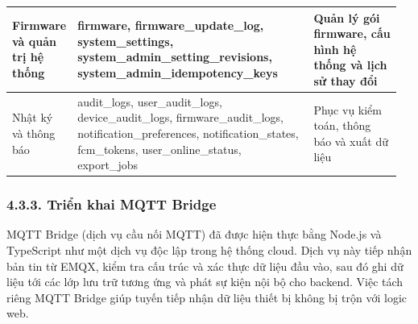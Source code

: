 \documentclass[a4paper]{extarticle}
\newcommand{\thesisterm}[1]{{\rmfamily #1}}
\begin{document}
{\begin{longtable}{|L{0.116\linewidth}|L{0.611\linewidth}|L{0.232\linewidth}|}
Firmware và quản trị hệ thống & \thesisterm{firmware}, \thesisterm{firmware\_update\_log}, \thesisterm{system\_settings}, \thesisterm{system\_admin\_setting\_revisions}, \thesisterm{system\_admin\_idempotency\_keys} & Quản lý gói firmware, cấu hình hệ thống và lịch sử thay đổi \\\hline
Nhật ký và thông báo & \thesisterm{audit\_logs}, \thesisterm{user\_audit\_logs}, \thesisterm{device\_audit\_logs}, \thesisterm{firmware\_audit\_logs}, \thesisterm{notification\_preferences}, \thesisterm{notification\_states}, \thesisterm{fcm\_tokens}, \thesisterm{user\_online\_status}, \thesisterm{export\_jobs} & Phục vụ kiểm toán, thông báo và xuất dữ liệu \\\hline
\end{longtable}
}

\subsubsection{4.3.3. Triển khai MQTT Bridge}\label{triux1ec3n-khai-mqtt-bridge}

MQTT Bridge (dịch vụ cầu nối MQTT) đã được hiện thực bằng Node.js và TypeScript
như một dịch vụ độc lập trong hệ thống cloud. Dịch vụ này tiếp nhận bản tin từ
EMQX, kiểm tra cấu trúc và xác thực dữ liệu đầu vào, sau đó ghi dữ liệu tới các
lớp lưu trữ tương ứng và phát sự kiện nội bộ cho backend. Việc tách riêng MQTT
Bridge giúp tuyến tiếp nhận dữ liệu thiết bị không bị trộn với logic web.
\end{document}

